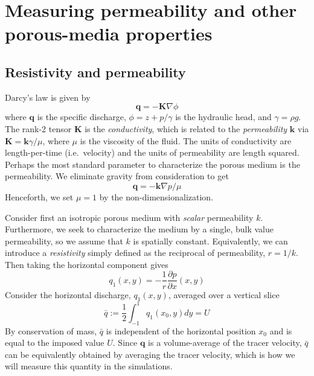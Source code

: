 \documentclass[3p]{elsarticle}
\newcommand{\grad}{{\nabla}}
\newcommand{\pderiv}[2]{\frac{\partial #1}{\partial #2}}
\newcommand{\bvec}[1]{\mathbf{#1}}
\newcommand {\bq} {\bvec{q}}
\newcommand{\qavg}{\bar{q}}
\begin{document}
\section{Measuring permeability and other porous-media properties}
\label{sec:}

\subsection{Resistivity and permeability}
Darcy's law is given by
\begin{equation}
\bq = - \bvec{K} \grad \phi
\end{equation}
where $\bq$ is the specific discharge, $\phi = z + p/\gamma$ is the hydraulic head, and $\gamma = \rho g$. The rank-2 tensor $\bvec{K}$ is the {\em conductivity}, which is related to the {\em permeability} $\bvec{k}$ via $\bvec{K} = \bvec{k} \gamma/\mu$, where $\mu$ is the viscosity of the fluid. The units of conductivity are length-per-time (i.e.~velocity) and the units of permeability are length squared.
Perhaps the most standard parameter to characterize the porous medium is the permeability. We eliminate gravity from consideration to get
\begin{equation}
\bq = - \bvec{k} \grad p / \mu
\end{equation}
Henceforth, we set $\mu = 1$ by the non-dimensionalization.

Consider first an isotropic porous medium with {\em scalar} permeability $k$. Furthermore, we seek to characterize the medium by a single, bulk value permeability, so we assume that $k$ is spatially constant.
Equivalently, we can introduce a {\em resistivity} simply defined as the reciprocal of permeability, $r = 1/k$. Then taking the horizontal component gives
\begin{equation}
\label{q1}
q_1(x,y) = -\frac{1}{r} \pderiv{p}{x}(x,y)
\end{equation}
Consider the horizontal discharge, $q_1(x,y)$, averaged over a vertical slice
\begin{equation}
\qavg := \frac{1}{2} \int_{-1}^{1} q_1(x_0, y) dy = U
\end{equation}
By conservation of mass, $\qavg$ is independent of the horizontal position $x_0$ and is equal to the imposed value $U$. Since $\bq$ is a volume-average of the tracer velocity, $\qavg$ can be equivalently obtained by averaging the tracer velocity, which is how we will measure this quantity in the simulations.
\end{document}
